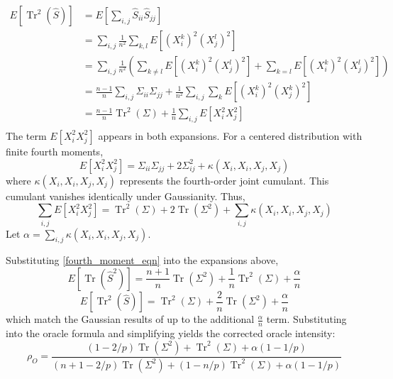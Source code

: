 \documentclass[10pt,twoside,titlepage]{article}
\begin{document}
\begin{equation*}
\begin{aligned}
E \left[ \operatorname{Tr}^2(\hat{S})\right] &= E \left[ \sum_{i,j} \hat{S}_{ii} \hat{S}_{jj} \right] \\
&= \sum_{i,j} \frac{1}{n^2} \sum_{k,l} E \left[  (X_i^k)^2  (X_j^l)^2  \right] \\
&= \sum_{i,j} \frac{1}{n^2} \left( \sum_{k \neq l} E \left[  (X_i^k)^2  (X_j^l)^2  \right] + \sum_{k = l} E \left[  (X_i^k)^2  (X_j^l)^2  \right] \right) \\
&= \frac{n-1}{n} \sum_{i,j} \Sigma_{ii} \Sigma_{jj} + \frac{1}{n^2} \sum_{i,j} \sum_k E \left[ (X_i^k)^2  (X_j^k)^2 \right] \\
&= \frac{n-1}{n} \operatorname{Tr}^2(\Sigma) + \frac{1}{n} \sum_{i,j} E \left[ X_i^2  X_j^2 \right] \\
\end{aligned}
\end{equation*}
The term $E \left[ X_i^2  X_j^2 \right]$ appears in both expansions.
For a centered distribution with finite fourth moments,
\begin{equation}
E \left[ X_i^2  X_j^2 \right] = \Sigma_{ii} \Sigma_{jj} + 2 \Sigma_{ij}^2 + \kappa( X_i, X_i, X_j, X_j )
\end{equation}
where $\kappa( X_i, X_i, X_j, X_j )$ represents the fourth-order joint cumulant.
This cumulant vanishes identically under Gaussianity.
Thus,
\begin{equation}
\label{fourth_moment_eqn}
\sum_{i,j} E \left[ X_i^2  X_j^2 \right] = \operatorname{Tr}^2(\Sigma) + 2 \operatorname{Tr}(\Sigma^2) + \sum_{i,j} \kappa( X_i, X_i, X_j, X_j )
\end{equation}
Let $\alpha =\sum_{i,j} \kappa( X_i, X_i, X_j, X_j )$.

Substituting \eqref{fourth_moment_eqn} into the expansions above,
\begin{equation}
E \left[ \operatorname{Tr}(\hat{S}^2)\right] = \frac{n+1}{n} \operatorname{Tr}(\Sigma^2) + \frac{1}{n} \operatorname{Tr}^2(\Sigma) + \frac{\alpha}{n}
\end{equation}
\begin{equation}
E \left[ \operatorname{Tr}^2(\hat{S})\right] = \operatorname{Tr}^2(\Sigma) + \frac{2}{n} \operatorname{Tr}(\Sigma^2) + \frac{\alpha}{n}
\end{equation}
which match the Gaussian results of \cite{OAS} up to the additional $\frac{\alpha}{n}$ term.
Substituting into the oracle formula and simplifying yields the corrected oracle intensity:
\begin{equation}
\label{opt_rho}
\rho_O = \frac{ (1-2/p) \operatorname{Tr}(\Sigma^2) + \operatorname{Tr}^2(\Sigma) + \alpha (1 - 1/p) }{ (n+1-2/p) \operatorname{Tr}(\Sigma^2) + (1 - n/p) \operatorname{Tr}^2(\Sigma) + \alpha (1 - 1/p) }
\end{equation}
\end{document}
